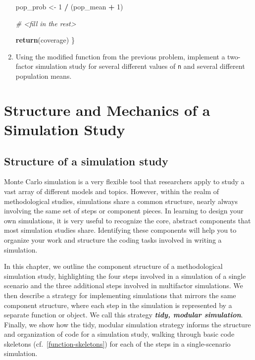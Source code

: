 \documentclass[
]{book}
\newenvironment{Shaded}{\begin{snugshade}}{\end{snugshade}}
\newcommand{\CommentTok}[1]{\textcolor[rgb]{0.56,0.35,0.01}{\textit{#1}}}
\newcommand{\DecValTok}[1]{\textcolor[rgb]{0.00,0.00,0.81}{#1}}
\newcommand{\FunctionTok}[1]{\textcolor[rgb]{0.13,0.29,0.53}{\textbf{#1}}}
\newcommand{\NormalTok}[1]{#1}
\newcommand{\OtherTok}[1]{\textcolor[rgb]{0.56,0.35,0.01}{#1}}
\newcommand{\SpecialCharTok}[1]{\textcolor[rgb]{0.81,0.36,0.00}{\textbf{#1}}}
\begin{document}
\begin{enumerate}
\begin{Shaded}
\begin{Highlighting}[]
\NormalTok{  pop\_prob }\OtherTok{\textless{}{-}} \DecValTok{1} \SpecialCharTok{/}\NormalTok{ (pop\_mean }\SpecialCharTok{+} \DecValTok{1}\NormalTok{)}

  \CommentTok{\# \textless{}fill in the rest\textgreater{}}

  \FunctionTok{return}\NormalTok{(coverage)}
\NormalTok{\}}
\end{Highlighting}
\end{Shaded}
\item
  Using the modified function from the previous problem, implement a two-factor simulation study for several different values of \texttt{n} and several different population means.
\end{enumerate}

\part{Structure and Mechanics of a Simulation Study}\label{part-structure-and-mechanics-of-a-simulation-study}

\chapter{Structure of a simulation study}\label{structure-of-a-simulation-study}

Monte Carlo simulation is a very flexible tool that researchers apply to study a vast array of different models and topics.
However, within the realm of methodological studies, simulations share a common structure, nearly always involving the same set of steps or component pieces.
In learning to design your own simulations, it is very useful to recognize the core, abstract components that most simulation studies share.
Identifying these components will help you to organize your work and structure the coding tasks involved in writing a simulation.

In this chapter, we outline the component structure of a methodological simulation study, highlighting the four steps involved in a simulation of a single scenario and the three additional steps involved in multifactor simulations.
We then describe a strategy for implementing simulations that mirrors the same component structure, where each step in the simulation is represented by a separate function or object.
We call this strategy \textbf{\emph{tidy, modular simulation}}.
Finally, we show how the tidy, modular simulation strategy informs the structure and organization of code for a simulation study, walking through basic code skeletons (cf.~\ref{function-skeletons}) for each of the steps in a single-scenario simulation.
\end{document}
